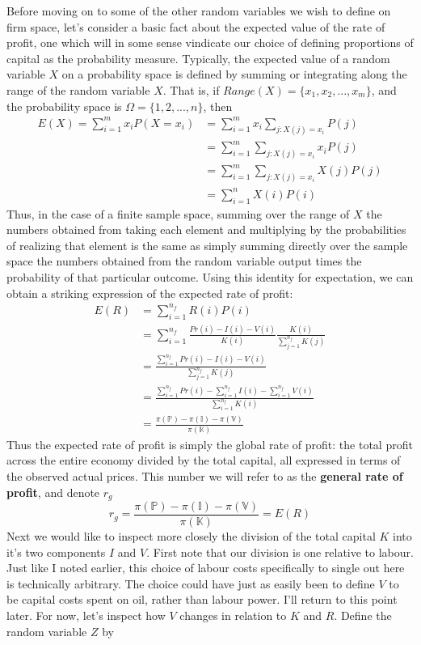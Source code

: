 \documentclass{article}
\theoremstyle{definition}
\theoremstyle{plain}
\theoremstyle{theorem}
\begin{document}
Before moving on to some of the other random variables we wish to define on firm space, let's consider a basic fact about the expected value of the rate of profit, one which will in some sense vindicate our choice of defining proportions of capital as the probability measure. Typically, the expected value of a random variable $X$ on a probability space is defined by summing or integrating along the range of the random variable $X$. That is, if $Range(X) = \{x_1,x_2,...,x_m\}$, and the probability space is $\Omega = \{1,2,...,n\}$, then
\begin{align}
	E(X) = \sum_{i=1}^m x_i P(X = x_i) &= \sum_{i=1}^m x_i \sum_{j: X(j)=x_i} P(j) \\
	&= \sum_{i=1}^m \sum_{j: X(j)=x_i} x_iP(j) \\
	&=  \sum_{i=1}^m \sum_{j: X(j)=x_i} X(j)P(j) \\
	&= \sum_{i=1}^n X(i)P(i)
\end{align} 
Thus, in the case of a finite sample space, summing over the range of $X$ the numbers obtained from taking each element and multiplying by the probabilities of realizing that element is the same as simply summing directly over the sample space the numbers obtained from the random variable output times the probability of that particular outcome. Using this identity for expectation, we can obtain a striking expression of the expected rate of profit:
\begin{align}
	E(R) &= \sum_{i=1}^{n_f} R(i)P(i) \\
		&= \sum_{i=1}^{n_f} \frac{Pr(i)-I(i)-V(i)}{K(i)}\frac{K(i)}{\sum_{j=1}^{n_f}K(j)} \\
		&= \frac{\sum_{i=1}^{n_f} Pr(i)-I(i)-V(i)}{\sum_{j=1}^{n_f} K(j)} \\
		&= \frac{\sum_{i=1}^{n_f} Pr(i) - \sum_{i=1}^{n_f} I(i) - \sum_{i=1}^{n_f} V(i)}{\sum_{i=1}^{n_f} K(i)} \\
		&= \frac{\pi(\mathbb{P}) - \pi(\mathbb{I}) - \pi(\mathbb{V})}{\pi(\mathbb{K})}
\end{align}
Thus the expected rate of profit is simply the global rate of profit: the total profit across the entire economy divided by the total capital, all expressed in terms of the observed actual prices. This number we will refer to as the \textbf{general rate of profit}, and denote $r_g$ 
\[ r_g = \frac{\pi(\mathbb{P}) - \pi(\mathbb{I}) - \pi(\mathbb{V})}{\pi(\mathbb{K})} = E(R) \]
Next we would like to inspect more closely the division of the total capital $K$ into it's two components $I$ and $V$. First note that our division is one relative to labour. Just like I noted earlier, this choice of labour costs specifically to single out here is technically arbitrary. The choice could have just as easily been to define $V$ to be capital costs spent on oil, rather than labour power. I'll return to this point later. For now, let's inspect how $V$ changes in relation to $K$ and $R$. Define the random variable $Z$ by
\end{document}
